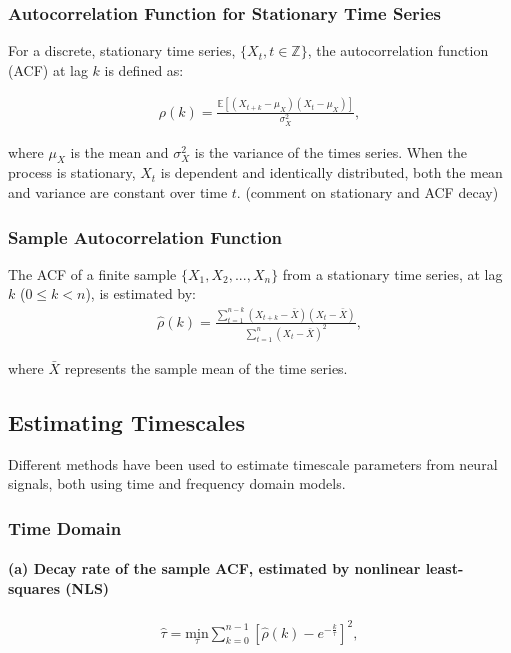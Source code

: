 \documentclass[10pt]{article}
\begin{document}
\subsubsection*{Autocorrelation Function for Stationary Time Series}

For a discrete, stationary time series, $\{X_t, t\in\mathbb{Z}\}$, the autocorrelation function (ACF) at lag $k$ is defined as:

\begin{align*}
    \rho(k) = \frac{\mathbb{E}[(X_{t+k} - \mu_X)(X_t - \mu_X)]}{\sigma_X^2},
\end{align*}

where $\mu_X$ is the mean and $\sigma^2_X$ is the variance of the times series. When the process is stationary, $X_t$ is dependent and identically distributed, both the mean and variance are constant over time $t$. (comment on stationary and ACF decay)\\

\subsubsection*{Sample Autocorrelation Function}

The ACF of a finite sample $\{X_1, X_2, ..., X_n\}$ from a stationary time series, at lag $k$ ($0 \le k < n$), is estimated by:
\begin{align*}
    \hat \rho(k) = \frac{\sum_{t=1}^{n-k}(X_{t+k} - \bar X)(X_t - \bar X)}{\sum_{t=1}^n(X_t - \bar X)^2},
\end{align*}

where $\bar X$ represents the sample mean of the time series.

\subsection{Estimating Timescales}
Different methods have been used to estimate timescale parameters from neural signals, both using time and frequency domain models.\\

\subsubsection*{Time Domain}
\paragraph{(a) Decay rate of the sample ACF, estimated by nonlinear least-squares (NLS)}
\begin{align*}
    \hat \tau = \underset{{\tau}}{\text{min}} \sum_{k=0}^{n-1}[\hat \rho(k) - e^{-\frac{k}{\tau}}]^2,
\end{align*}
\end{document}
